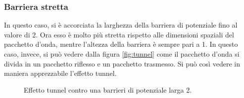  \subsubsection{Barriera stretta}
 In questo caso, si è accorciata la larghezza della barriera di potenziale fino al valore di 2. Ora esso è molto più stretta rispetto alle dimensioni spaziali del pacchetto d'onda, mentre l'altezza della barriera è sempre pari a 1. In questo caso, invece, 
si può vedere dalla figura \ref{fig:tunnel} come il pacchetto d'onda si divida in un pacchetto riflesso e un pacchetto trasmesso. Si può così vedere in maniera
apprezzabile l'effetto tunnel.
\begin{figure}[!h]
 \centering
  \caption{\small{Effetto tunnel contro una barrieri di potenziale larga 2.}}

 \end{figure}
 
